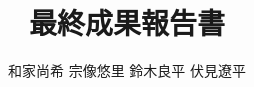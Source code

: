 \documentclass{jsarticle}
\begin{document}
 \makeatletter
    \renewcommand{\thefigure}{
    \thesection.\arabic{figure}}
  \makeatother

  \makeatletter
    \renewcommand{\thetable}{%
    \thesection.\arabic{table}}
  \makeatother

\title{最終成果報告書}
\author{和家尚希 宗像悠里 鈴木良平 伏見遼平}
\maketitle

\tableofcontents %
\thispagestyle{empty} %












\end{document}
